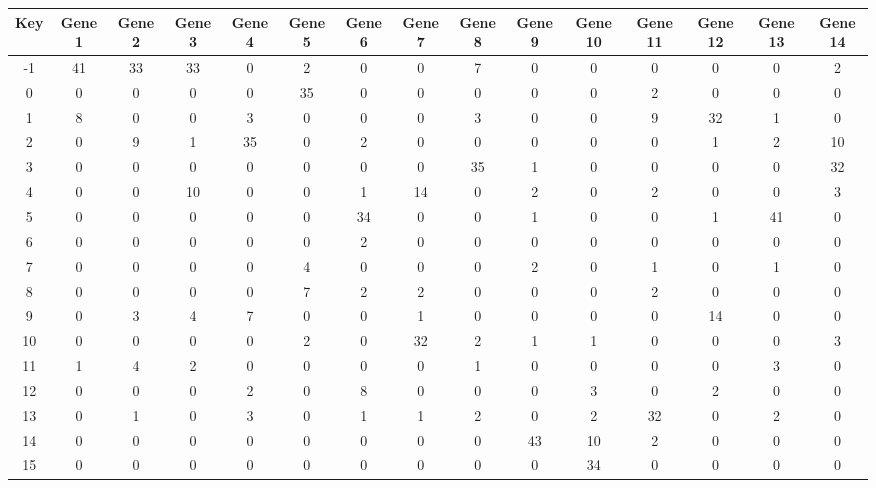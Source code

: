 \begin{tabular}{|c|c|c|c|c|c|c|c|c|c|c|c|c|c|c|}
\hline
Key & Gene 1 & Gene 2 & Gene 3 & Gene 4 & Gene 5 & Gene 6 & Gene 7 & Gene 8 & Gene 9 & Gene 10 & Gene 11 & Gene 12 & Gene 13 & Gene 14 \\
\hline
-1 & 41 & 33 & 33 & 0 & 2 & 0 & 0 & 7 & 0 & 0 & 0 & 0 & 0 & 2 \\
0 & 0 & 0 & 0 & 0 & 35 & 0 & 0 & 0 & 0 & 0 & 2 & 0 & 0 & 0 \\
1 & 8 & 0 & 0 & 3 & 0 & 0 & 0 & 3 & 0 & 0 & 9 & 32 & 1 & 0 \\
2 & 0 & 9 & 1 & 35 & 0 & 2 & 0 & 0 & 0 & 0 & 0 & 1 & 2 & 10 \\
3 & 0 & 0 & 0 & 0 & 0 & 0 & 0 & 35 & 1 & 0 & 0 & 0 & 0 & 32 \\
4 & 0 & 0 & 10 & 0 & 0 & 1 & 14 & 0 & 2 & 0 & 2 & 0 & 0 & 3 \\
5 & 0 & 0 & 0 & 0 & 0 & 34 & 0 & 0 & 1 & 0 & 0 & 1 & 41 & 0 \\
6 & 0 & 0 & 0 & 0 & 0 & 2 & 0 & 0 & 0 & 0 & 0 & 0 & 0 & 0 \\
7 & 0 & 0 & 0 & 0 & 4 & 0 & 0 & 0 & 2 & 0 & 1 & 0 & 1 & 0 \\
8 & 0 & 0 & 0 & 0 & 7 & 2 & 2 & 0 & 0 & 0 & 2 & 0 & 0 & 0 \\
9 & 0 & 3 & 4 & 7 & 0 & 0 & 1 & 0 & 0 & 0 & 0 & 14 & 0 & 0 \\
10 & 0 & 0 & 0 & 0 & 2 & 0 & 32 & 2 & 1 & 1 & 0 & 0 & 0 & 3 \\
11 & 1 & 4 & 2 & 0 & 0 & 0 & 0 & 1 & 0 & 0 & 0 & 0 & 3 & 0 \\
12 & 0 & 0 & 0 & 2 & 0 & 8 & 0 & 0 & 0 & 3 & 0 & 2 & 0 & 0 \\
13 & 0 & 1 & 0 & 3 & 0 & 1 & 1 & 2 & 0 & 2 & 32 & 0 & 2 & 0 \\
14 & 0 & 0 & 0 & 0 & 0 & 0 & 0 & 0 & 43 & 10 & 2 & 0 & 0 & 0 \\
15 & 0 & 0 & 0 & 0 & 0 & 0 & 0 & 0 & 0 & 34 & 0 & 0 & 0 & 0 \\
\hline
\end{tabular}